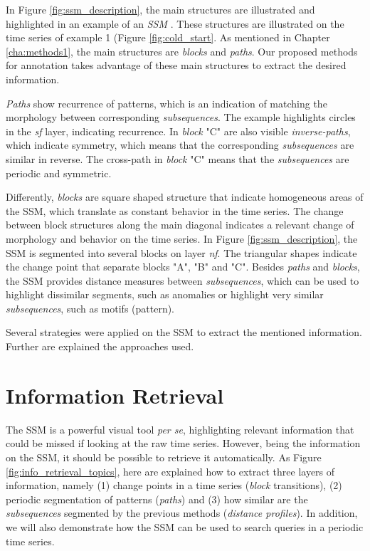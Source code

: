 In Figure \ref{fig:ssm_description}, the main structures are illustrated and highlighted in an example of an \textit{\gls{SSM}} \cite{audiolabs1}. These structures are illustrated on the time series of example 1 (Figure \ref{fig:cold_start}. As mentioned in Chapter \ref{cha:methods1}, the main structures are \textit{blocks} and \textit{paths}. Our proposed methods for annotation takes advantage of these main structures to extract the desired information.
\par
\textit{Paths} show recurrence of patterns, which is an indication of matching the morphology between corresponding \textit{subsequences}. The example highlights circles in the \textit{sf} layer, indicating recurrence. In \textit{block} "C" are also visible \textit{inverse-paths}, which indicate symmetry, which means that the corresponding \textit{subsequences} are similar in reverse. The cross-path in \textit{block} "C" means that the \textit{subsequences} are periodic and symmetric.
\par
Differently, \textit{blocks} are square shaped structure that indicate homogeneous areas of the \gls{SSM}, which translate as constant behavior in the time series. The change between block structures along the main diagonal indicates a relevant change of morphology and behavior on the time series. In Figure \ref{fig:ssm_description}, the \gls{SSM} is segmented into several blocks on layer \textit{nf}. The triangular shapes indicate the change point that separate blocks "A", "B" and "C". Besides \textit{paths} and \textit{blocks}, the \gls{SSM} provides distance measures between \textit{subsequences}, which can be used to highlight dissimilar segments, such as anomalies or highlight very similar \textit{subsequences}, such as motifs (pattern).
\par
Several strategies were applied on the \gls{SSM} to extract the mentioned information. Further are explained the approaches used.

\section{Information Retrieval}

The \gls{SSM} is a powerful visual tool \textit{per se}, highlighting relevant information that could be missed if looking at the raw time series. However, being the information on the \gls{SSM}, it should be possible to retrieve it automatically. As Figure \ref{fig:info_retrieval_topics}, here are explained how to extract three layers of information, namely (1) change points in a time series (\textit{block} transitions), (2) periodic segmentation of patterns (\textit{paths}) and (3) how similar are the \textit{subsequences} segmented by the previous methods (\textit{distance profiles}). In addition, we will also demonstrate how the \gls{SSM} can be used to search queries in a periodic time series.

